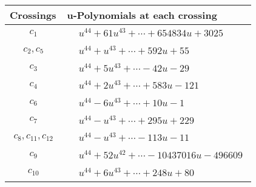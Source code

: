 \documentclass[1p]{elsarticle_modified}
\theoremstyle{definition}
\begin{document}
\begin{tabular}{m{50pt}|m{274pt}}
Crossings & \hspace{64pt}u-Polynomials at each crossing \\
\hline $$\begin{aligned}c_{1}\end{aligned}$$&$\begin{aligned}
&u^{44}+61 u^{43}+\cdots+654834 u+3025
\end{aligned}$\\
\hline $$\begin{aligned}c_{2},c_{5}\end{aligned}$$&$\begin{aligned}
&u^{44}+u^{43}+\cdots+592 u+55
\end{aligned}$\\
\hline $$\begin{aligned}c_{3}\end{aligned}$$&$\begin{aligned}
&u^{44}+5 u^{43}+\cdots-42 u-29
\end{aligned}$\\
\hline $$\begin{aligned}c_{4}\end{aligned}$$&$\begin{aligned}
&u^{44}+2 u^{43}+\cdots+583 u-121
\end{aligned}$\\
\hline $$\begin{aligned}c_{6}\end{aligned}$$&$\begin{aligned}
&u^{44}-6 u^{43}+\cdots+10 u-1
\end{aligned}$\\
\hline $$\begin{aligned}c_{7}\end{aligned}$$&$\begin{aligned}
&u^{44}- u^{43}+\cdots+295 u+229
\end{aligned}$\\
\hline $$\begin{aligned}c_{8},c_{11},c_{12}\end{aligned}$$&$\begin{aligned}
&u^{44}- u^{43}+\cdots-113 u-11
\end{aligned}$\\
\hline $$\begin{aligned}c_{9}\end{aligned}$$&$\begin{aligned}
&u^{44}+52 u^{42}+\cdots-10437016 u-496609
\end{aligned}$\\
\hline $$\begin{aligned}c_{10}\end{aligned}$$&$\begin{aligned}
&u^{44}+6 u^{43}+\cdots+248 u+80
\end{aligned}$\\
\hline
\end{tabular}\\~\\
\end{document}
